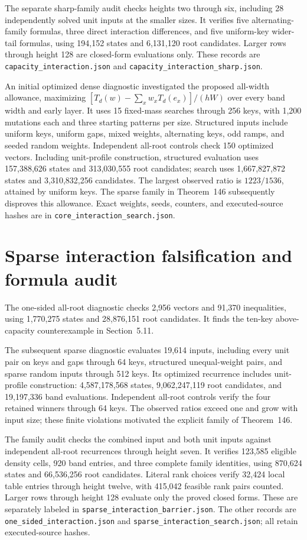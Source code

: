 \documentclass[11pt]{article}
\begin{document}
The separate sharp-family audit checks heights two through six, including
28 independently solved unit inputs at the smaller sizes. It verifies five
alternating-family formulas, three direct interaction differences, and five
uniform-key wider-tail formulas, using 194,152 states and 6,131,120 root
candidates. Larger rows through height 128 are closed-form evaluations only.
These records are \texttt{capacity\_interaction.json} and
\texttt{capacity\_interaction\_sharp.json}.

An initial optimized dense diagnostic investigated the proposed all-width allowance,
maximizing $[T_d(w)-\sum_xw_xT_d(e_x)]/(hW)$ over every band width and early
layer. It uses 15 fixed-mass searches through 256 keys, with 1,200 mutations
each and three starting patterns per size. Structured inputs include uniform
keys, uniform gaps, mixed weights, alternating keys, odd ramps, and seeded
random weights. Independent all-root controls check 150 optimized vectors.
Including unit-profile construction, structured evaluation uses 157,388,626
states and 313,030,555 root candidates; search uses 1,667,827,872 states and
3,310,832,256 candidates. The largest observed ratio is $1223/1536$, attained
by uniform keys. The sparse family in Theorem~146
subsequently disproves this allowance. Exact weights, seeds,
counters, and executed-source hashes are in
\texttt{core\_interaction\_search.json}.

\section{Sparse interaction falsification and formula audit}
\label{app:sparse-interaction}
The one-sided all-root diagnostic checks 2,956 vectors and 91,370 inequalities,
using 1,770,275 states and 28,876,151 root candidates. It finds the ten-key
above-capacity counterexample in Section~5.11.

The subsequent sparse diagnostic evaluates 19,614 inputs, including every
unit pair on keys and gaps through 64 keys, structured unequal-weight pairs,
and sparse random inputs through 512 keys. Its optimized recurrence includes
unit-profile construction: 4,587,178,568 states, 9,062,247,119 root candidates,
and 19,197,336 band evaluations. Independent all-root controls verify the
four retained winners through 64 keys. The observed ratios exceed one and
grow with input size; these finite violations motivated the explicit family
of Theorem~146.

The family audit checks the combined input and both unit inputs against
independent all-root recurrences through height seven. It verifies 123,585
eligible density cells, 920 band entries, and three complete family
identities, using 870,624 states and 66,536,256 root candidates. Literal rank
choices verify 32,424 local table entries through height twelve, with
415,042 feasible rank pairs counted. Larger rows through height 128 evaluate
only the proved closed forms. These are separately labeled in
\texttt{sparse\_interaction\_barrier.json}. The other records are
\texttt{one\_sided\_interaction.json} and
\texttt{sparse\_interaction\_search.json}; all retain executed-source hashes.
\end{document}
